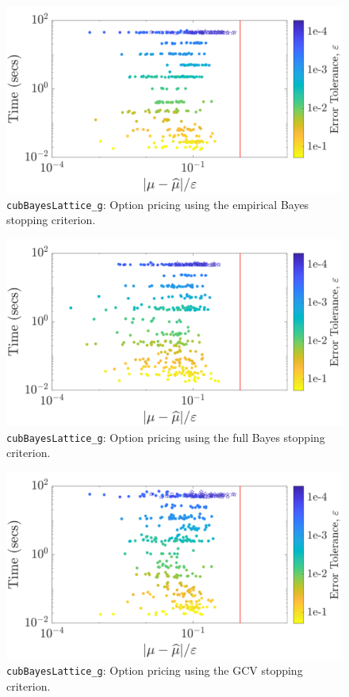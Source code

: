 \documentclass{iitthesis}          %
\newcommand{\code}[1]{\texttt{#1}}
\begin{document}
{{{{{{\label{sec:cubBayesLattice_option_pricing_example}
\begin{figure}
	\centering
	\includegraphics[width=0.95\linewidth]{"Lattice/Lattice_optPrice_guaranteed_time_MLE_Baker_d12_r1_2019-Jul-9"}
	\caption[Lattice: Option pricing guaranteed: MLE]{\code{cubBayesLattice\_g}: Option pricing using the empirical Bayes stopping criterion.}
	\label{fig:optprice-guaranteed-MLE}
\end{figure}
\begin{figure}
	\centering
	\includegraphics[width=0.95\linewidth]{"Lattice/Lattice_optPrice_guaranteed_time_full_Baker_d12_r1_2019-Jul-9"}
	\caption[Lattice: Option pricing guaranteed: Full Bayes]{\code{cubBayesLattice\_g}: Option pricing using the full Bayes stopping criterion.}
	\label{fig:optprice-guaranteed-FB}
\end{figure}
\begin{figure}
	\centering
	\includegraphics[width=0.95\linewidth]{"Lattice/Lattice_optPrice_guaranteed_time_GCV_Baker_d12_r1_2019-Jul-8"}
	\caption[Lattice: Option pricing guaranteed: GCV]{\code{cubBayesLattice\_g}: Option pricing using the  GCV stopping criterion.} \label{fig:optprice-guaranteed-GCV}
\end{figure}


}}}}}}
\end{document}
